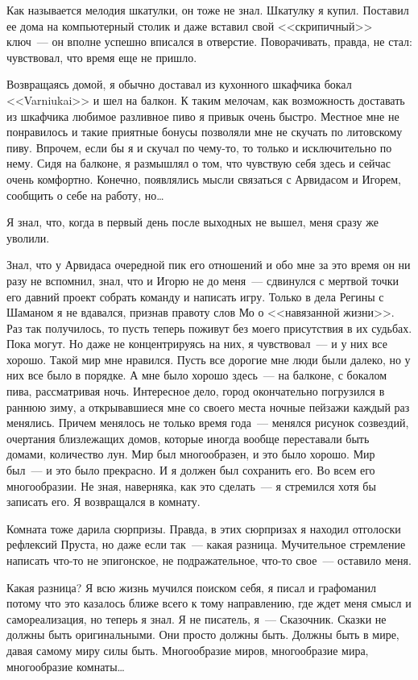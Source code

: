 Как называется мелодия шкатулки, он тоже не знал. Шкатулку я купил. Поставил ее 
дома на компьютерный столик и даже вставил свой <<скрипичный>> ключ~--- он 
вполне успешно вписался в отверстие. Поворачивать, правда, не стал: чувствовал, что 
время еще не пришло.

Возвращаясь домой, я обычно доставал из кухонного шкафчика бокал <<Varniukai>> 
и шел на балкон. К таким мелочам, как возможность доставать из шкафчика любимое 
разливное пиво я привык очень быстро. Местное мне не понравилось и такие 
приятные бонусы позволяли мне не скучать по литовскому пиву. Впрочем, если бы я 
и скучал по чему-то, то только и исключительно по нему. Сидя на балконе, я 
размышлял о том, что чувствую себя здесь и сейчас очень комфортно. Конечно, 
появлялись мысли связаться с Арвидасом и Игорем, сообщить о себе на работу, 
но\ldots

Я знал, что, когда в первый день после выходных не вышел, меня сразу же 
уволили. 

Знал, что у Арвидаса очередной пик его отношений и обо мне за это время он ни 
разу не вспомнил, знал, что и Игорю не до меня~--- сдвинулся с мертвой точки 
его давний проект собрать команду и написать игру. Только в дела Регины с Шаманом я 
не вдавался, признав правоту слов Мо о <<навязанной жизни>>. Раз так 
получилось, то пусть теперь поживут без моего присутствия в их судьбах. Пока могут. Но даже 
не концентрируясь на них, я чувствовал~--- и у них все хорошо. Такой мир мне 
нравился. Пусть все дорогие мне люди были далеко, но у них все было в порядке. 
А мне было хорошо здесь~--- на балконе, с бокалом пива, рассматривая ночь. 
Интересное дело, город окончательно погрузился в раннюю зиму, а открывавшиеся 
мне со своего места ночные пейзажи каждый раз менялись. Причем менялось не 
только время года~--- менялся рисунок созвездий, очертания близлежащих домов, 
которые иногда вообще переставали быть домами, количество лун. Мир был 
многообразен, и это было хорошо. Мир был~--- и это было прекрасно. И я должен 
был сохранить его. Во всем его многообразии. Не зная, наверняка, как это 
сделать~--- я стремился хотя бы записать его. Я возвращался в комнату.

Комната тоже дарила сюрпризы. Правда, в этих сюрпризах я находил отголоски 
рефлексий Пруста, но даже если так~--- какая разница. Мучительное стремление 
написать что-то не эпигонское, не подражательное, что-то свое~--- оставило 
меня. 

Какая разница? Я всю жизнь мучился поиском себя, я писал и графоманил потому 
что это казалось ближе всего к тому направлению, где ждет меня смысл и 
самореализация, но теперь я знал. Я не писатель, я~--- Сказочник. Сказки не 
должны быть оригинальными. Они просто должны быть. Должны быть в мире, давая самому 
миру силы быть. Многообразие миров, многообразие мира, многообразие 
комнаты\ldots\

